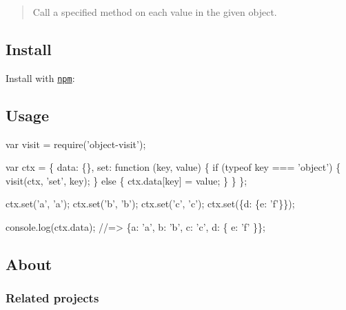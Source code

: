 \begin{quote}
Call a specified method on each value in the given object. \end{quote}


\subsection*{Install}

Install with \href{https://www.npmjs.com/}{\tt npm}\+:




\subsection*{Usage}


\begin{DoxyCode}
var visit = require('object-visit');

var ctx = \{
  data: \{\},
  set: function (key, value) \{
    if (typeof key === 'object') \{
      visit(ctx, 'set', key);
    \} else \{
      ctx.data[key] = value;
    \}
  \}
\};

ctx.set('a', 'a');
ctx.set('b', 'b');
ctx.set('c', 'c');
ctx.set(\{d: \{e: 'f'\}\});

console.log(ctx.data);
//=> \{a: 'a', b: 'b', c: 'c', d: \{ e: 'f' \}\};
\end{DoxyCode}


\subsection*{About}

\subsubsection*{Related projects}


